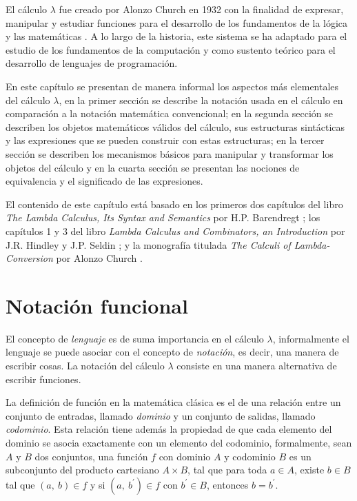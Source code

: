 El cálculo \( λ \) fue creado por Alonzo Church en 1932 con la finalidad de expresar, manipular y estudiar funciones para el desarrollo de los fundamentos de la lógica y las matemáticas \cite[p.~248]{Church:FoundationsLogic}. A lo largo de la historia, este sistema se ha adaptado para el estudio de los fundamentos de la computación y como sustento teórico para el desarrollo de lenguajes de programación.

En este capítulo se presentan de manera informal los aspectos más elementales del cálculo \( λ \), en la primer sección se describe la notación usada en el cálculo en comparación a la notación matemática convencional; en la segunda sección se describen los objetos matemáticos válidos del cálculo, sus estructuras sintácticas y las expresiones que se pueden construir con estas estructuras; en la tercer sección se describen los mecanismos básicos para manipular y transformar los objetos del cálculo y en la cuarta sección se presentan las nociones de equivalencia y el significado de las expresiones.

El contenido de este capítulo está basado en los primeros dos capítulos del libro \emph{The Lambda Calculus, Its Syntax and Semantics} por H.P. Barendregt \cite{Barendregt:Bible}; los capítulos 1 y 3 del libro \emph{Lambda Calculus and Combinators, an Introduction} por J.R. Hindley y J.P. Seldin \cite{HindleySeldin:LambdaCalculusAndCombinators}; y la monografía titulada \emph{The Calculi of Lambda-Conversion} por Alonzo Church \cite{Church:LambdaConversion}.

\section{Notación funcional}
\label{sec:notacion-funcional}

El concepto de \emph{lenguaje} es de suma importancia en el cálculo \( λ \), informalmente el lenguaje se puede asociar con el concepto de \emph{notación}, es decir, una manera de escribir cosas. La notación del cálculo \( λ \) consiste en una manera alternativa de escribir funciones.

La definición de función en la matemática clásica es el de una relación entre un conjunto de entradas, llamado \emph{dominio} y un conjunto de salidas, llamado \emph{codominio}. Esta relación tiene además la propiedad de que cada elemento del dominio se asocia exactamente con un elemento del codominio, formalmente, sean \( A \) y \( B \) dos conjuntos, una función \( f \) con dominio \( A \) y codominio \( B \) es un subconjunto del producto cartesiano \( A \times B \), tal que para toda \( a \in A \), existe \( b \in B \) tal que \( (a,\ b) \in f \) y si \( (a,\ b^{\prime}) \in f \) con \( b^{\prime} \in B \), entonces \( b=b^{\prime} \).

